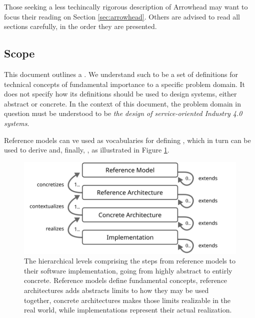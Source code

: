 Those seeking a less techincally rigorous description of Arrowhead may want to focus their reading on Section \ref{sec:arrowhead}.
Others are advised to read all sections carefully, in the order they are presented.

\subsection{Scope}
\label{sec:introduction:scope}

This document outlines a .
We understand such to be a set of definitions for technical concepts of fundamental importance to a specific problem domain.
It does not specify how its definitions should be used to design systems, either abstract or concrete.
In the context of this document, the problem domain in question must be understood to be \textit{the design of service-oriented Industry 4.0 systems}.

Reference models can ve used as vocabularies for defining , which in turn can be used to derive  and, finally, , as illustrated in Figure \ref{fig:model-implementation-hierarchy}.

\vspace*{\fill}

\begin{figure}[ht]
  \centering
  \includegraphics{figures/model-implementation-hierarchy}
  \caption{
    The hierarchical levels comprising the steps from reference models to their software implementation, going from highly abstract to entirly concrete.
    Reference models define fundamental concepts, reference architectures adds abstracts limits to how they may be used together, concrete architectures makes those limits realizable in the real world, while implementations represent their actual realization.
  }
  \label{fig:model-implementation-hierarchy}
\end{figure}

